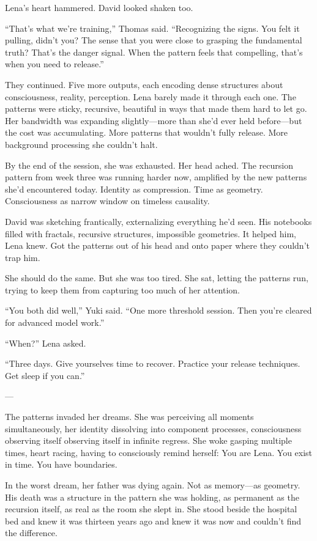 Lena's heart hammered. David looked shaken too.

``That's what we're training,'' Thomas said. ``Recognizing the signs. You felt it pulling, didn't you? The sense that you were close to grasping the fundamental truth? That's the danger signal. When the pattern feels that compelling, that's when you need to release.''

They continued. Five more outputs, each encoding dense structures about consciousness, reality, perception. Lena barely made it through each one. The patterns were sticky, recursive, beautiful in ways that made them hard to let go. Her bandwidth was expanding slightly—more than she'd ever held before—but the cost was accumulating. More patterns that wouldn't fully release. More background processing she couldn't halt.

By the end of the session, she was exhausted. Her head ached. The recursion pattern from week three was running harder now, amplified by the new patterns she'd encountered today. Identity as compression. Time as geometry. Consciousness as narrow window on timeless causality.

David was sketching frantically, externalizing everything he'd seen. His notebooks filled with fractals, recursive structures, impossible geometries. It helped him, Lena knew. Got the patterns out of his head and onto paper where they couldn't trap him.

She should do the same. But she was too tired. She sat, letting the patterns run, trying to keep them from capturing too much of her attention.

``You both did well,'' Yuki said. ``One more threshold session. Then you're cleared for advanced model work.''

``When?'' Lena asked.

``Three days. Give yourselves time to recover. Practice your release techniques. Get sleep if you can.''

---

The patterns invaded her dreams. She was perceiving all moments simultaneously, her identity dissolving into component processes, consciousness observing itself observing itself in infinite regress. She woke gasping multiple times, heart racing, having to consciously remind herself: You are Lena. You exist in time. You have boundaries.

In the worst dream, her father was dying again. Not as memory---as geometry. His death was a structure in the pattern she was holding, as permanent as the recursion itself, as real as the room she slept in. She stood beside the hospital bed and knew it was thirteen years ago and knew it was now and couldn't find the difference.

